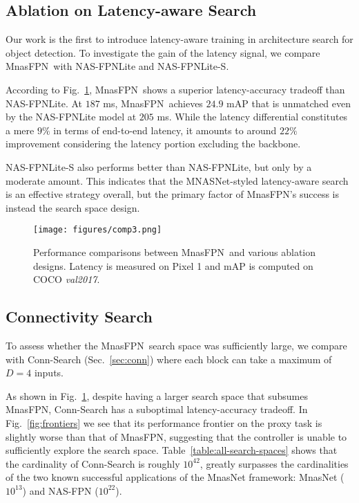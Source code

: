 \documentclass[10pt,twocolumn,letterpaper]{article}
\def\Mnasfpn{MnasFPN~}
\def\Mnasfpnnospace{MnasFPN}
\begin{document}
\subsection{Ablation on Latency-aware Search}
\label{sec:ablation-lat}
Our work is the first to introduce latency-aware training in architecture search for object detection. To investigate the gain of the latency signal, we compare \Mnasfpn with NAS-FPNLite and NAS-FPNLite-S. 

According to Fig.~\ref{fig:comp}, \Mnasfpn shows a superior latency-accuracy tradeoff than NAS-FPNLite. At $187$ ms, \Mnasfpn achieves $24.9$ mAP that is unmatched even by the NAS-FPNLite model at $205$ ms. While the latency differential constitutes a mere $9\%$ in terms of end-to-end latency, it amounts to around $22\%$ improvement considering the latency portion excluding the backbone. 

NAS-FPNLite-S also performs better than NAS-FPNLite, but only by a moderate amount. This indicates that the MNASNet-styled latency-aware search is an effective strategy overall, but the primary factor of \Mnasfpnnospace's success is instead the search space design.


\begin{figure}[!t]
    \centering
    \texttt{[image: figures/comp3.png]}
    \caption{Performance comparisons between \Mnasfpn and various ablation designs. Latency is measured on Pixel 1 and mAP is computed on COCO {\it val2017}.}
    \label{fig:comp}
\end{figure}


\subsection{Connectivity Search}
To assess whether the \Mnasfpn search space was sufficiently large, we compare with Conn-Search (Sec.~\ref{sec:conn}) where each block can take a maximum of $D=4$ inputs.





As shown in Fig.~\ref{fig:comp}, despite having a larger search space that subsumes \Mnasfpnnospace, Conn-Search has a suboptimal latency-accuracy tradeoff. In Fig.~\ref{fig:frontiers} we see that its performance frontier on the proxy task is slightly worse than that of \Mnasfpnnospace, suggesting that the controller is unable to sufficiently explore the search space. Table~\ref{table:all-search-spaces} shows that the cardinality of Conn-Search is roughly $10^{42}$, greatly surpasses the cardinalities of the two known successful applications of the MnasNet framework: MnasNet ($10^{13}$) and NAS-FPN ($10^{22}$).
\end{document}
